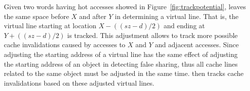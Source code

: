 Given two words having hot accesses showed in Figure~\ref{fig:trackpotential}, 
\Predator{} leaves the same space before $X$ and after $Y$ in determining a virtual line. 
That is, the virtual line starting 
at location $X-((sz-d)/2)$ and ending at $Y+((sz-d)/2)$ is tracked. 
This adjustment allows to track more possible cache invalidations caused by
accesses to $X$ and $Y$ and adjacent accesses.
Since adjusting the starting address of a virtual line has the same effect of
adjusting the starting address of an object in detecting false sharing, thus
all cache lines related to the same object must be adjusted in the same time.
\Predator{} then tracks cache invalidations based on these adjusted virtual lines.

